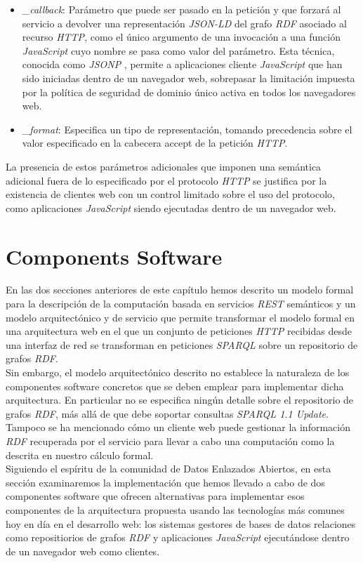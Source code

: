 \begin{itemize}

\item \textit{\_callback}: Par\'ametro que puede ser pasado en la petici\'on y que forzar\'a al servicio a devolver una representaci\'on \textit{JSON-LD} del grafo \textit{RDF} asociado al recurso \textit{HTTP}, como el \'unico argumento de una invocaci\'on a una funci\'on \textit{JavaScript} cuyo nombre se pasa como valor del par\'ametro. Esta t\'ecnica, conocida como \textit{JSONP} \cite{jsonp}, permite a aplicaciones cliente \textit{JavaScript} que han sido iniciadas dentro de un navegador web, sobrepasar la limitaci\'on impuesta por la pol\'itica de seguridad de dominio \'unico activa en todos los navegadores web.\\
\item \textit{\_format}: Especifica un tipo de representaci\'on, tomando precedencia sobre el valor especificado en la cabecera accept de la petici\'on \textit{HTTP}.

\end{itemize}

La presencia de estos par\'ametros adicionales que imponen una sem\'antica adicional fuera de lo especificado por el protocolo \textit{HTTP} se justifica por la existencia de clientes web con un control limitado sobre el uso del protocolo, como aplicaciones \textit{JavaScript} siendo ejecutadas dentro de un navegador web.

\section{Components Software}

En las dos secciones anteriores de este cap\'itulo hemos descrito un modelo formal para la descripci\'on de la computaci\'on basada en servicios \textit{REST} sem\'anticos y un modelo arquitect\'onico y de servicio que permite transformar el modelo formal en una arquitectura web en el que un conjunto de peticiones \textit{HTTP} recibidas desde una interfaz de red se transforman en peticiones \textit{SPARQL} sobre un repositorio de grafos \textit{RDF}.\\
Sin embargo, el modelo arquitect\'onico descrito no establece la naturaleza de los componentes software concretos que se deben emplear para implementar dicha arquitectura. En particular no se especifica ning\'un detalle sobre el repositorio de grafos \textit{RDF}, m\'as all\'a de que debe soportar consultas \textit{SPARQL 1.1 Update}. Tampoco se ha mencionado c\'omo un cliente web puede gestionar la informaci\'on \textit{RDF} recuperada por el servicio para llevar a cabo una computaci\'on como la descrita en  nuestro c\'alculo formal.\\
Siguiendo el esp\'iritu de la comunidad de Datos Enlazados Abiertos, en esta secci\'on examinaremos la implementaci\'on que hemos llevado a cabo de dos componentes software que ofrecen alternativas para implementar esos componentes de la arquitectura propuesta usando las tecnolog\'ias m\'as comunes hoy en d\'ia en el desarrollo web: los sistemas gestores de bases de datos relaciones como repositiorios de grafos \textit{RDF} y aplicaciones \textit{JavaScript} ejecut\'andose dentro de un navegador web como clientes.

